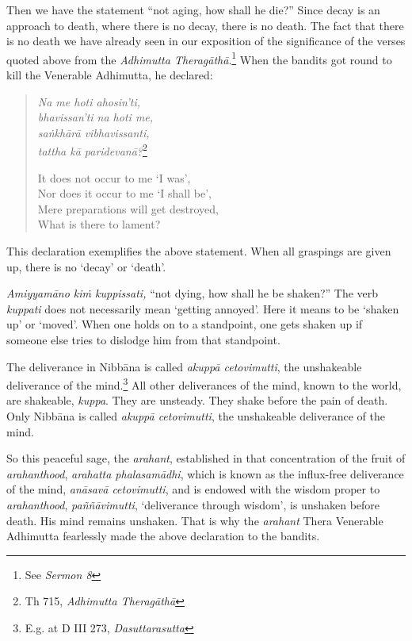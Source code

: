 Then we have the statement ``not aging, how shall he die?'' Since decay is an approach to death, where there is no decay, there is no death. The fact that there is no death we have already seen in our exposition of the significance of the verses quoted above from the \emph{Adhimutta Theragāthā}.\footnote{See \emph{Sermon 8}} When the bandits got round to kill the Venerable Adhimutta, he declared:

\begin{quote}
\emph{Na me hoti ahosin'ti,}\\
\emph{bhavissan'ti na hoti me,}\\
\emph{saṅkhārā vibhavissanti,}\\
\emph{tattha kā paridevanā?}\footnote{Th 715, \emph{Adhimutta Theragāthā}}

It does not occur to me `I was',\\
Nor does it occur to me `I shall be',\\
Mere preparations will get destroyed,\\
What is there to lament?
\end{quote}

This declaration exemplifies the above statement. When all graspings are given up, there is no `decay' or `death'.

\emph{Amiyyamāno kiṁ kuppissati,} ``not dying, how shall he be shaken?'' The verb \emph{kuppati} does not necessarily mean `getting annoyed'. Here it means to be `shaken up' or `moved'. When one holds on to a standpoint, one gets shaken up if someone else tries to dislodge him from that standpoint.

The deliverance in Nibbāna is called \emph{akuppā cetovimutti}, the unshakeable deliverance of the mind.\footnote{E.g. at D III 273, \emph{Dasuttarasutta}} All other deliverances of the mind, known to the world, are shakeable, \emph{kuppa}. They are unsteady. They shake before the pain of death. Only Nibbāna is called \emph{akuppā cetovimutti}, the unshakeable deliverance of the mind.

So this peaceful sage, the \emph{arahant}, established in that concentration of the fruit of \emph{arahanthood}, \emph{arahatta phalasamādhi}, which is known as the influx-free deliverance of the mind, \emph{anāsavā cetovimutti}, and is endowed with the wisdom proper to \emph{arahanthood}, \emph{paññāvimutti}, `deliverance through wisdom', is unshaken before death. His mind remains unshaken. That is why the \emph{arahant} Thera Venerable Adhimutta fearlessly made the above declaration to the bandits.

